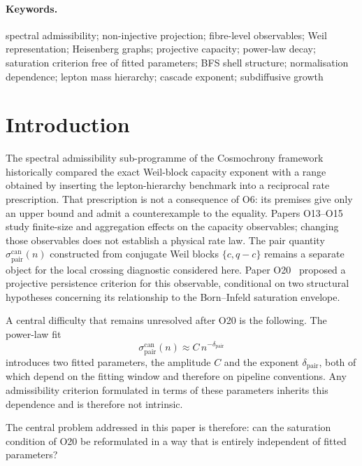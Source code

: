 \documentclass[11pt,a4paper]{article}
\theoremstyle{definition}
\theoremstyle{remark}
\begin{document}
  \paragraph{Keywords.}
    spectral admissibility; non-injective projection; fibre-level observables; Weil representation; Heisenberg graphs;
    projective capacity; power-law decay; saturation criterion free of fitted parameters; BFS shell structure; normalisation dependence; lepton
    mass hierarchy; cascade exponent; subdiffusive growth

    \clearpage
    \tableofcontents

    \clearpage
  \section{Introduction}
  \label{sec:intro}

  The spectral admissibility sub-programme of the Cosmochrony
  framework~\cite{Cosmochrony} historically compared the exact Weil-block
  capacity exponent with a range obtained by inserting the lepton-hierarchy
  benchmark into a reciprocal rate prescription.
  That prescription is not a consequence of O6: its premises give only an
  upper bound and admit a counterexample to the equality.
  Papers O13--O15~\cite{Beau2026a17,Beau2026a18,Beau2026a19}
  study finite-size and aggregation effects on the capacity observables;
  changing those observables does not establish a physical rate law.
  The pair quantity $\sigma_{\mathrm{pair}}^{\mathrm{can}}(n)$
  constructed from conjugate Weil blocks $\{c,q-c\}$ remains a separate
  object for the local crossing diagnostic considered here.
  Paper O20~\cite{Beau2026a24} proposed a projective persistence
  criterion for this observable, conditional on two structural
  hypotheses concerning its relationship to the Born--Infeld
  saturation envelope.

  A central difficulty that remains unresolved after O20 is
  the following.
  The power-law fit
  \[
    \sigma_{\mathrm{pair}}^{\mathrm{can}}(n)
    \approx C\,n^{-\delta_{\mathrm{pair}}}
  \]
  introduces two fitted parameters, the amplitude $C$ and the
  exponent $\delta_{\mathrm{pair}}$, both of which depend on
  the fitting window and therefore on pipeline conventions.
  Any admissibility criterion formulated in terms of these
  parameters inherits this dependence and is therefore not
  intrinsic.

  The central problem addressed in this paper is therefore:
  can the saturation condition of O20 be reformulated in a
  way that is entirely independent of fitted parameters?
\end{document}
